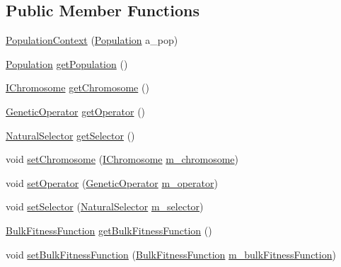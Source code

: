 \subsection*{Public Member Functions}
\begin{DoxyCompactItemize}
\item 
\hyperlink{classorg_1_1jgap_1_1eval_1_1_population_context_a464134bd04a841044baa66670368471d}{Population\-Context} (\hyperlink{classorg_1_1jgap_1_1_population}{Population} a\-\_\-pop)
\item 
\hyperlink{classorg_1_1jgap_1_1_population}{Population} \hyperlink{classorg_1_1jgap_1_1eval_1_1_population_context_a3fdb70e762b4c02277b2b2f54a7d75ec}{get\-Population} ()
\item 
\hyperlink{interfaceorg_1_1jgap_1_1_i_chromosome}{I\-Chromosome} \hyperlink{classorg_1_1jgap_1_1eval_1_1_population_context_aa4c4d9cd832450bcc4fceed02694280f}{get\-Chromosome} ()
\item 
\hyperlink{interfaceorg_1_1jgap_1_1_genetic_operator}{Genetic\-Operator} \hyperlink{classorg_1_1jgap_1_1eval_1_1_population_context_ab5902b238f50cdec37f4128c48475a90}{get\-Operator} ()
\item 
\hyperlink{classorg_1_1jgap_1_1_natural_selector}{Natural\-Selector} \hyperlink{classorg_1_1jgap_1_1eval_1_1_population_context_a0d8f9a29f5e20dbd25c4c2fc53da577f}{get\-Selector} ()
\item 
void \hyperlink{classorg_1_1jgap_1_1eval_1_1_population_context_ada20102640dc0267ec213754ffc1e1c6}{set\-Chromosome} (\hyperlink{interfaceorg_1_1jgap_1_1_i_chromosome}{I\-Chromosome} \hyperlink{classorg_1_1jgap_1_1eval_1_1_population_context_a26a703dc95c171c546cc3101ff38aef3}{m\-\_\-chromosome})
\item 
void \hyperlink{classorg_1_1jgap_1_1eval_1_1_population_context_a00d41316ab19ef7b327685c8a20ac72d}{set\-Operator} (\hyperlink{interfaceorg_1_1jgap_1_1_genetic_operator}{Genetic\-Operator} \hyperlink{classorg_1_1jgap_1_1eval_1_1_population_context_adc2a1b84dd5267c5755d052ddf09fe60}{m\-\_\-operator})
\item 
void \hyperlink{classorg_1_1jgap_1_1eval_1_1_population_context_a5466f499b9f5fd38778fe21f2253e587}{set\-Selector} (\hyperlink{classorg_1_1jgap_1_1_natural_selector}{Natural\-Selector} \hyperlink{classorg_1_1jgap_1_1eval_1_1_population_context_ab959944469baaad8d4d52196c42659fa}{m\-\_\-selector})
\item 
\hyperlink{classorg_1_1jgap_1_1_bulk_fitness_function}{Bulk\-Fitness\-Function} \hyperlink{classorg_1_1jgap_1_1eval_1_1_population_context_a37d21418e4266fde64519aee9f784a13}{get\-Bulk\-Fitness\-Function} ()
\item 
void \hyperlink{classorg_1_1jgap_1_1eval_1_1_population_context_a414e7c42839c19368897cded61976d50}{set\-Bulk\-Fitness\-Function} (\hyperlink{classorg_1_1jgap_1_1_bulk_fitness_function}{Bulk\-Fitness\-Function} \hyperlink{classorg_1_1jgap_1_1eval_1_1_population_context_a07c021db7fd3d7fb680958bba9e3e93e}{m\-\_\-bulk\-Fitness\-Function})
\end{DoxyCompactItemize}
